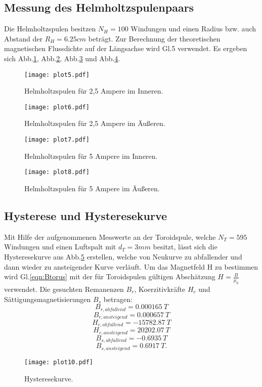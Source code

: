 \subsection{Messung des Helmholtzspulenpaars}
Die Helmholtzspulen besitzen $N_H = 100$ Windungen und einen Radius bzw. auch Abstand
der $R_H = 6.25 cm$ beträgt. Zur Berechnung der theoretischen magnetischen Flussdichte auf der Längsachse wird
Gl.5 verwendet. Es ergeben sich Abb.\ref{fig:plot5}, Abb.\ref{fig:plot6}, Abb.\ref{fig:plot7} und Abb.\ref{fig:plot8}.

\begin{figure}
  \centering
  \texttt{[image: plot5.pdf]}
  \caption{Helmholtzspulen für 2,5 Ampere im Inneren.}
  \label{fig:plot5}
\end{figure}
\begin{figure}
  \centering
  \texttt{[image: plot6.pdf]}
  \caption{Helmholtzspulen für 2,5 Ampere im Äußeren.}
  \label{fig:plot6}
\end{figure}\begin{figure}
  \centering
  \texttt{[image: plot7.pdf]}
  \caption{Helmholtzspulen für 5 Ampere im Inneren.}
  \label{fig:plot7}
\end{figure}
\begin{figure}
  \centering
  \texttt{[image: plot8.pdf]}
  \caption{Helmholtzspulen für 5 Ampere im Äußeren.}
  \label{fig:plot8}
\end{figure}

\subsection{Hysterese und Hysteresekurve}

Mit Hilfe der aufgenommenen Messwerte an der Toroidspule, welche $N_T = 595$
Windungen und einen Luftspalt mit $ d_T = 3mm$ besitzt, lässt sich die
Hysteresekurve aus Abb.\ref{fig:plot10} erstellen, welche von Neukurve zu abfallender und dann wieder zu ansteigender Kurve verläuft.
Um das Magnetfeld H zu bestimmen
wird Gl.\ref{eqn:Btorus} mit der für Toroidspulen gültigen Abschätzung $ H = \frac{B}{\mu_0}$
verwendet.
Die gesuchten Remanenzen $B_r$, Koerzitivkräfte $H_c$ und Sättigungsmagnetisierungen $B_s$
betragen:
\begin{equation}
  B_{r,abfallend} = \SI{0.000165}{T}
\end{equation}
\begin{equation}
  B_{r,ansteigend} = \SI{0.000657}{T}
\end{equation}
\begin{equation}
  H_{c,abfallend} = \SI{-15782.87}{T}
\end{equation}
\begin{equation}
  H_{c,ansteigend} = \SI{20202.07}{T}
\end{equation}
\begin{equation}
  B_{s,abfallend} = \SI{-0.6935}{T}
\end{equation}
\begin{equation}
  B_{s,ansteigend} = \SI{0.6917}{T}.
\end{equation}

\begin{figure}
  \centering
  \texttt{[image: plot10.pdf]}
  \caption{Hysteresekurve.}
  \label{fig:plot10}
\end{figure}
